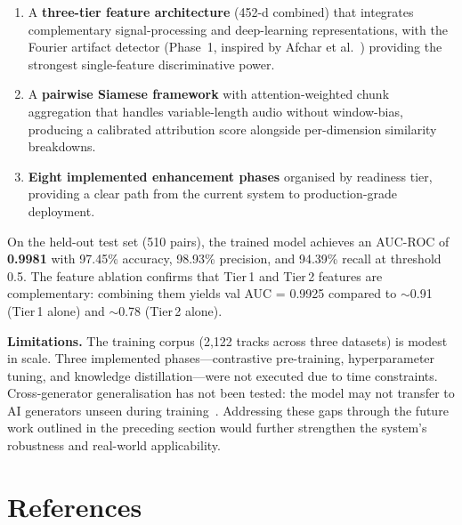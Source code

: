 \documentclass[11pt,a4paper]{article}
\begin{document}
\begin{enumerate}[nosep]
  \item A \textbf{three-tier feature architecture} (452-d combined) that integrates complementary signal-processing and deep-learning representations, with the Fourier artifact detector (Phase~1, inspired by Afchar et al.~\cite{A1}) providing the strongest single-feature discriminative power.
  \item A \textbf{pairwise Siamese framework} with attention-weighted chunk aggregation that handles variable-length audio without window-bias, producing a calibrated attribution score alongside per-dimension similarity breakdowns.
  \item \textbf{Eight implemented enhancement phases} organised by readiness tier, providing a clear path from the current system to production-grade deployment.
\end{enumerate}

On the held-out test set (510 pairs), the trained model achieves an AUC-ROC of \textbf{0.9981} with 97.45\% accuracy, 98.93\% precision, and 94.39\% recall at threshold 0.5. The feature ablation confirms that Tier\,1 and Tier\,2 features are complementary: combining them yields val AUC = 0.9925 compared to $\sim$0.91 (Tier\,1 alone) and $\sim$0.78 (Tier\,2 alone).

\textbf{Limitations.} The training corpus (2,122 tracks across three datasets) is modest in scale. Three implemented phases---contrastive pre-training, hyperparameter tuning, and knowledge distillation---were not executed due to time constraints. Cross-generator generalisation has not been tested: the model may not transfer to AI generators unseen during training~\cite{A1}. Addressing these gaps through the future work outlined in the preceding section would further strengthen the system's robustness and real-world applicability.


\section*{References}
\end{document}
